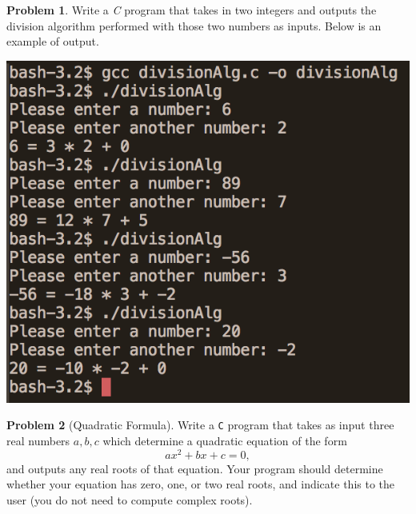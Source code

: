 \documentclass[10pt]{article}
\numberwithin{pic}{section}
\numberwithin{lem}{section}
\numberwithin{thm}{section}
\numberwithin{cor}{section}
\theoremstyle{definition}
\numberwithin{ex}{section}
\numberwithin{defn}{section}
\theoremstyle{definition}
\newtheorem{prob}{Problem}
\numberwithin{prob}{section}
\theoremstyle{remark}
\theoremstyle{plain}
\numberwithin{claim}{prob}
\begin{document}

\begin{prob}
  Write a \textit{C} program that takes in two integers and outputs the division algorithm performed with those two numbers as inputs. Below is an example of output.\\
  \begin{center}
    \includegraphics[scale=0.5]{soln1}
  \end{center}
\end{prob}
  \begin{prob}[Quadratic Formula] Write a \texttt{C} program that takes as input
    three real numbers $a,b,c$ which determine a quadratic equation of the form
    \begin{equation*}
      ax^2 + bx + c = 0,
    \end{equation*}
    and outputs any real roots of that equation. Your program should determine
    whether your equation has zero, one, or two real roots, and indicate this to
    the user (you do not need to compute complex roots).
  \end{prob}
\end{document}
